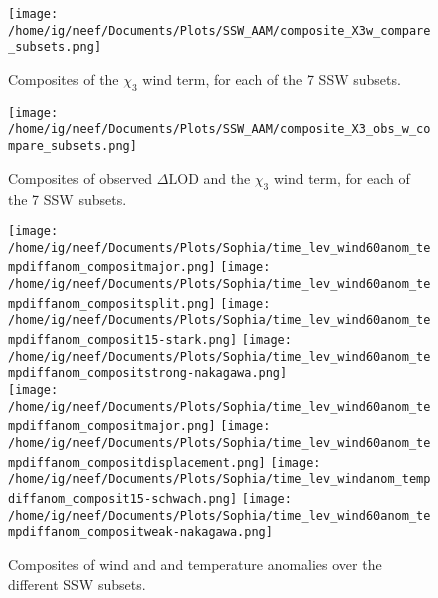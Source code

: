 \documentclass[11pt]{article}
\newcommand{\dlod}{{\Delta \text{LOD}}}
\begin{document}
\begin{figure}
  \noindent
  \texttt{[image: /home/ig/neef/Documents/Plots/SSW\_AAM/composite\_X3w\_compare\_subsets.png]}
  \caption{Composites of  the $\chi_3$ wind term, for each of the 7 SSW subsets.}
   \label{fig:X3_w_subsets}
 \end{figure}

\begin{figure}
  \noindent
  \texttt{[image: /home/ig/neef/Documents/Plots/SSW\_AAM/composite\_X3\_obs\_w\_compare\_subsets.png]}
  \caption{Composites of observed $\dlod$ and the $\chi_3$ wind term, for each of the 7 SSW subsets.}
   \label{fig:X3_obs_w_subsets}
 \end{figure}

\begin{landscape}

\begin{figure}
  \noindent
  \texttt{[image: /home/ig/neef/Documents/Plots/Sophia/time\_lev\_wind60anom\_tempdiffanom\_compositmajor.png]}
  \texttt{[image: /home/ig/neef/Documents/Plots/Sophia/time\_lev\_wind60anom\_tempdiffanom\_compositsplit.png]}
  \texttt{[image: /home/ig/neef/Documents/Plots/Sophia/time\_lev\_wind60anom\_tempdiffanom\_composit15-stark.png]}
  \texttt{[image: /home/ig/neef/Documents/Plots/Sophia/time\_lev\_wind60anom\_tempdiffanom\_compositstrong-nakagawa.png]} \\
  \texttt{[image: /home/ig/neef/Documents/Plots/Sophia/time\_lev\_wind60anom\_tempdiffanom\_compositmajor.png]}
  \texttt{[image: /home/ig/neef/Documents/Plots/Sophia/time\_lev\_wind60anom\_tempdiffanom\_compositdisplacement.png]}
  \texttt{[image: /home/ig/neef/Documents/Plots/Sophia/time\_lev\_windanom\_tempdiffanom\_composit15-schwach.png]}
  \texttt{[image: /home/ig/neef/Documents/Plots/Sophia/time\_lev\_wind60anom\_tempdiffanom\_compositweak-nakagawa.png]} \\
  \caption{Composites of wind and and temperature anomalies over the different SSW subsets.}
   \label{fig:compare_windanom_composites}
 \end{figure}


\end{landscape}
\end{document}
